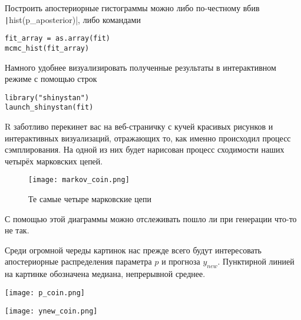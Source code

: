 Построить апостериорные гистограммы можно либо по-честному вбив  \texttt|hist(p_aposterior)|, либо командами
 
\begin{verbatim}
fit_array = as.array(fit)
mcmc_hist(fit_array)  
\end{verbatim}
 
Намного удобнее визуализировать полученные результаты в интерактивном режиме с помощью строк

\begin{verbatim} 
library("shinystan")
launch_shinystan(fit)
\end{verbatim}

R заботливо перекинет вас на веб-страничку с кучей красивых рисунков и интерактивных визуализаций, отражающих то, как именно происходил процесс сэмплирования. На одной из них будет нарисован процесс сходимости наших четырёх марковских цепей. 

  \begin{figure}[H]
 	\begin{center}
 		\texttt{[image: markov\_coin.png]}
 		\caption{Те самые четыре марковские цепи} 
 	\end{center}
 \end{figure}


С помощью этой диаграммы можно отслеживать пошло ли при генерации что-то не так. 


Среди огромной череды картинок нас прежде всего будут интересовать апостериорные распределения параметра $p$ и прогноза $y_{new}$. Пунктирной линией на картинке обозначена медиана, непрерывной среднее. 

\vspace{1cm}

	\begin{minipage}[H]{0.47\linewidth}
		\begin{center}
			\texttt{[image: p\_coin.png]}
		\end{center}
	\end{minipage}
\hfill
	\begin{minipage}[H]{0.47\linewidth}
		\begin{center}
			\texttt{[image: ynew\_coin.png]}
		\end{center}
	\end{minipage}

 \vspace{0.5cm}
 
